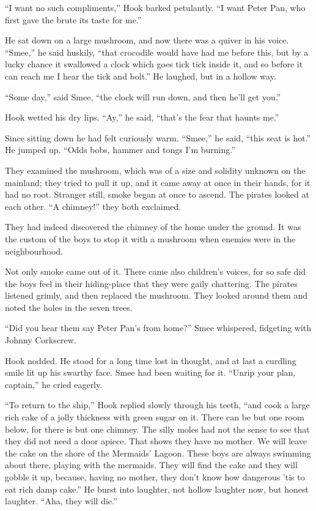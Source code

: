 ``I want no such compliments,'' Hook barked petulantly.
``I want Peter Pan, who first gave the brute its taste for me.''

He sat down on a large mushroom, and now there was a quiver in his voice.
``Smee,'' he said huskily, ``that crocodile would have had me before this, but
by a lucky chance it swallowed a clock which goes tick tick inside it, and so
before it can reach me I hear the tick and bolt.''
He laughed, but in a hollow way.

``Some day,'' said Smee, ``the clock will run down, and then he'll get you.''

Hook wetted his dry lips.
``Ay,'' he said, ``that's the fear that haunts me.''

Since sitting down he had felt curiously warm.
``Smee,'' he said, ``this seat is hot.''
He jumped up.
``Odds bobs, hammer and tongs I'm burning.''

They examined the mushroom, which was of a size and solidity unknown on the
mainland; they tried to pull it up, and it came away at once in their hands,
for it had no root.
Stranger still, smoke began at once to ascend.
The pirates looked at each other.
``A chimney!''
they both exclaimed.

They had indeed discovered the chimney of the home under the ground.
It was the custom of the boys to stop it with a mushroom when enemies were in
the neighbourhood.

Not only smoke came out of it.
There came also children's voices, for so safe did the boys feel in their
hiding-place that they were gaily chattering.
The pirates listened grimly, and then replaced the mushroom.
They looked around them and noted the holes in the seven trees.

``Did you hear them say Peter Pan's from home?''
Smee whispered, fidgeting with Johnny Corkscrew.

Hook nodded.
He stood for a long time lost in thought, and at last a curdling smile lit up
his swarthy face.
Smee had been waiting for it.
``Unrip your plan, captain,'' he cried eagerly.

``To return to the ship,'' Hook replied slowly through his teeth, ``and
cook a large rich cake of a jolly thickness with green sugar on it.
There can be but one room below, for there is but one chimney.
The silly moles had not the sense to see that they did not need a door apiece.
That shows they have no mother.
We will leave the cake on the shore of the Mermaids' Lagoon.
These boys are always swimming about there, playing with the mermaids.
They will find the cake and they will gobble it up, because, having no mother,
they don't know how dangerous 'tis to eat rich damp cake.''
He burst into laughter, not hollow laughter now, but honest laughter.
``Aha, they will die.''

